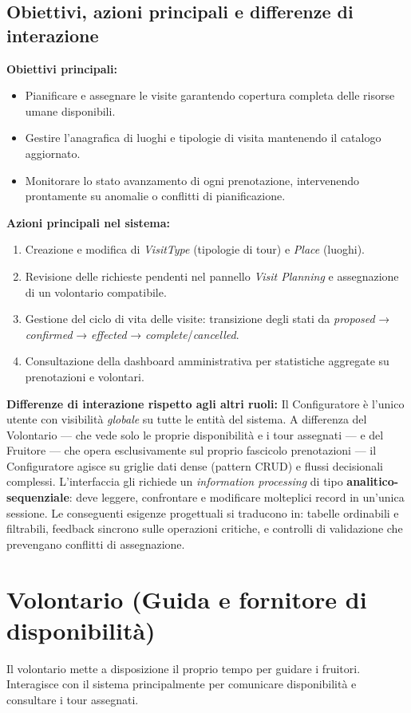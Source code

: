 \subsection{Obiettivi, azioni principali e differenze di interazione}
\textbf{Obiettivi principali:}
\begin{itemize}
    \item Pianificare e assegnare le visite garantendo copertura completa delle risorse umane disponibili.
    \item Gestire l'anagrafica di luoghi e tipologie di visita mantenendo il catalogo aggiornato.
    \item Monitorare lo stato avanzamento di ogni prenotazione, intervenendo prontamente su anomalie o conflitti di pianificazione.
\end{itemize}

\textbf{Azioni principali nel sistema:}
\begin{enumerate}
    \item Creazione e modifica di \textit{VisitType} (tipologie di tour) e \textit{Place} (luoghi).
    \item Revisione delle richieste pendenti nel pannello \textit{Visit Planning} e assegnazione di un volontario compatibile.
    \item Gestione del ciclo di vita delle visite: transizione degli stati da \textit{proposed} → \textit{confirmed} → \textit{effected} → \textit{complete}/\textit{cancelled}.
    \item Consultazione della dashboard amministrativa per statistiche aggregate su prenotazioni e volontari.
\end{enumerate}

\textbf{Differenze di interazione rispetto agli altri ruoli:}
Il Configuratore è l'unico utente con visibilità \emph{globale} su tutte le entità del sistema. A differenza del Volontario — che vede solo le proprie disponibilità e i tour assegnati — e del Fruitore — che opera esclusivamente sul proprio fascicolo prenotazioni — il Configuratore agisce su griglie dati dense (pattern CRUD) e flussi decisionali complessi. L'interfaccia gli richiede un \textit{information processing} di tipo \textbf{analitico-sequenziale}: deve leggere, confrontare e modificare molteplici record in un'unica sessione. Le conseguenti esigenze progettuali si traducono in: tabelle ordinabili e filtrabili, feedback sincrono sulle operazioni critiche, e controlli di validazione che prevengano conflitti di assegnazione.

\section{Volontario (Guida e fornitore di disponibilità)}
Il volontario mette a disposizione il proprio tempo per guidare i fruitori. Interagisce con il sistema principalmente per comunicare disponibilità e consultare i tour assegnati.

